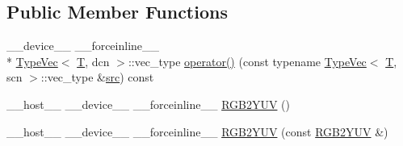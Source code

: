 \subsection*{Public Member Functions}
\begin{DoxyCompactItemize}
\item 
\-\_\-\-\_\-device\-\_\-\-\_\- \-\_\-\-\_\-forceinline\-\_\-\-\_\- \\*
\hyperlink{structcv_1_1gpu_1_1device_1_1TypeVec}{Type\-Vec}$<$ \hyperlink{calib3d_8hpp_a3efb9551a871ddd0463079a808916717}{T}, dcn $>$\-::vec\-\_\-type \hyperlink{structcv_1_1gpu_1_1device_1_1color__detail_1_1RGB2YUV_ab28a89a9b6ec4276acd64994aa184500}{operator()} (const typename \hyperlink{structcv_1_1gpu_1_1device_1_1TypeVec}{Type\-Vec}$<$ \hyperlink{calib3d_8hpp_a3efb9551a871ddd0463079a808916717}{T}, scn $>$\-::vec\-\_\-type \&\hyperlink{legacy_8hpp_a371cd109b74033bc4366f584edd3dacc}{src}) const 
\item 
\-\_\-\-\_\-host\-\_\-\-\_\- \-\_\-\-\_\-device\-\_\-\-\_\- \-\_\-\-\_\-forceinline\-\_\-\-\_\- \hyperlink{structcv_1_1gpu_1_1device_1_1color__detail_1_1RGB2YUV_a0b324aa6caba5bbb054f5ed58e0d731f}{R\-G\-B2\-Y\-U\-V} ()
\item 
\-\_\-\-\_\-host\-\_\-\-\_\- \-\_\-\-\_\-device\-\_\-\-\_\- \-\_\-\-\_\-forceinline\-\_\-\-\_\- \hyperlink{structcv_1_1gpu_1_1device_1_1color__detail_1_1RGB2YUV_af1a05ae5f5a6dcf55335e34dc10bb60a}{R\-G\-B2\-Y\-U\-V} (const \hyperlink{structcv_1_1gpu_1_1device_1_1color__detail_1_1RGB2YUV}{R\-G\-B2\-Y\-U\-V} \&)
\end{DoxyCompactItemize}


